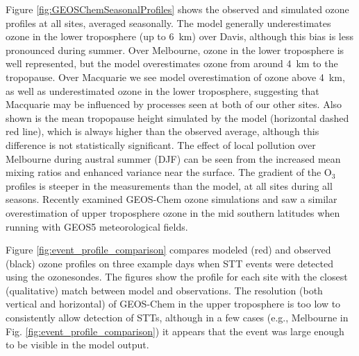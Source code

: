 \documentclass[acp, manuscript]{copernicus} %
\begin{document}
  Figure \ref{fig:GEOSChemSeasonalProfiles} shows the observed and simulated ozone profiles at all sites, averaged seasonally.
  The model generally underestimates ozone in the lower troposphere (up to 6~km) over Davis, although this bias is less pronounced during summer.
  Over Melbourne, ozone in the lower troposphere is well represented, but the model overestimates ozone from around 4~km to the tropopause.
  Over Macquarie we see model overestimation of ozone above 4~km, as well as underestimated ozone in the lower troposphere, suggesting that Macquarie may be influenced by processes seen at both of our other sites.
  Also shown is the mean tropopause height simulated by the model (horizontal dashed red line), which is always higher than the observed average, although this difference is not statistically significant.
  The effect of local pollution over Melbourne during austral summer (DJF) can be seen from the increased mean mixing ratios and enhanced variance near the surface.
  The gradient of the O$_3$ profiles is steeper in the measurements than the model, at all sites during all seasons.
  Recently \cite{Hu2017} examined GEOS-Chem ozone simulations and saw a similar overestimation of upper troposphere ozone in the mid southern latitudes when running with GEOS5 meteorological fields.
  
  Figure \ref{fig:event_profile_comparison} compares modeled (red) and observed (black) ozone profiles on three example days when STT events were detected using the ozonesondes. 
  The figures show the profile for each site with the closest (qualitative) match between model and observations.
  The resolution (both vertical and horizontal) of GEOS-Chem in the upper troposphere is too low to consistently allow detection of STTs, although in a few cases (e.g., Melbourne in Fig. \ref{fig:event_profile_comparison}) it appears that the event was large enough to be visible in the model output.
  
\end{document}
